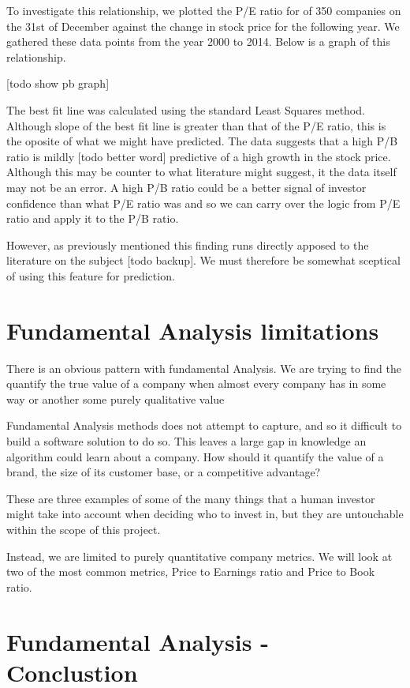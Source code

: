 \documentclass{report}
\begin{document}
To investigate this relationship, we plotted the P/E ratio for of 350 companies on the 31st of December against the change in stock price for the following year. We gathered these data points from the year 2000 to 2014. Below is a graph of this relationship.

[todo show pb graph]

The best fit line was calculated using the standard Least Squares method. Although slope of the best fit line is greater than that of the P/E ratio, this is the oposite of what we might have predicted. The data suggests that a high P/B ratio is mildly [todo better word] predictive of a high growth in the stock price. Although this may be counter to what literature might suggest, it the data itself may not be an error. A high P/B ratio could be a better signal of investor confidence than what P/E ratio was and so we can carry over the logic from P/E ratio and apply it to the P/B ratio. 

However, as previously mentioned this finding runs directly apposed to the literature on the subject [todo backup]. We must therefore be somewhat sceptical of using this feature for prediction. 

\section{Fundamental Analysis limitations}

There is an obvious pattern with fundamental Analysis. We are trying to find the quantify the true value of a company when almost every company has in some way or another some purely qualitative value

Fundamental Analysis methods does not attempt to capture, and so it difficult to build a software solution to do so. This leaves a large gap in knowledge an algorithm could learn about a company. How should it quantify the value of a brand, the size of its customer base, or a competitive advantage?

These are three examples of some of the many things that a human investor might take into account when deciding who to invest in, but they are untouchable within the scope of this project. 

Instead, we are limited to purely quantitative company metrics. We will look at two of the most common metrics, Price to Earnings ratio and Price to Book ratio.

\section{Fundamental Analysis - Conclustion}
\end{document}
